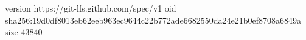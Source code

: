 version https://git-lfs.github.com/spec/v1
oid sha256:19d0df8013eb62eeb963ec9644c22b772ade6682550da24e21b0ef8708a6849a
size 43840
